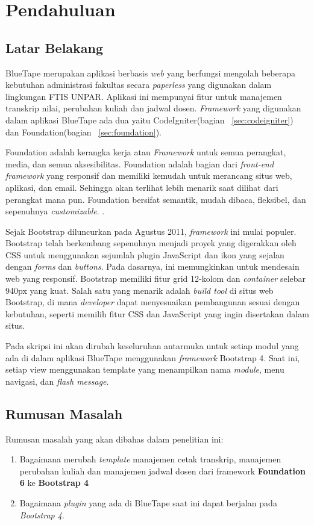 \chapter{Pendahuluan}
\label{chap:intro}
   
\section{Latar Belakang}
\label{sec:label}

\par BlueTape merupakan aplikasi berbasis \textit{web} yang berfungsi mengolah beberapa kebutuhan administrasi fakultas secara \textit{paperless} yang digunakan dalam lingkungan FTIS UNPAR.  Aplikasi ini mempunyai fitur untuk manajemen transkrip nilai, perubahan kuliah dan jadwal dosen. \textit{Framework} yang digunakan dalam aplikasi BlueTape ada dua yaitu CodeIgniter(bagian ~\ref{sec:codeigniter}) dan Foundation(bagian ~\ref{sec:foundation}).  \par
Foundation adalah kerangka kerja atau \textit{Framework } untuk semua perangkat, media, dan semua aksesibilitas. Foundation adalah bagian dari \textit{front-end framework}  yang responsif dan memiliki kemudah untuk merancang situs web, aplikasi, dan email. Sehingga akan terlihat lebih menarik saat dilihat dari perangkat mana pun. Foundation bersifat semantik, mudah dibaca, fleksibel, dan sepenuhnya \textit{customizable}.
\cite{zurbfoundation:17}.\par
Sejak Bootstrap diluncurkan pada Agustus 2011, \textit{framework} ini mulai populer. Bootstrap telah berkembang sepenuhnya menjadi proyek yang digerakkan oleh CSS untuk menggunakan sejumlah plugin JavaScript dan ikon yang sejalan dengan \textit{forms} dan \textit{buttons}. Pada dasarnya, ini memungkinkan untuk mendesain web yang responsif. Bootstrap memiliki fitur grid 12-kolom dan \textit{container} selebar 940px yang kuat. Salah satu yang menarik adalah \textit{build tool} di situs web Bootstrap, di mana \textit{developer} dapat menyesuaikan pembangunan sesuai dengan kebutuhan, seperti memilih fitur CSS dan JavaScript yang ingin disertakan dalam situs. \cite{bootstrap:19}\par
Pada skripsi ini akan dirubah keseluruhan  antarmuka untuk setiap modul yang ada di dalam aplikasi BlueTape menggunakan \textit{framework} Bootstrap 4. Saat ini, setiap view menggunakan template yang menampilkan nama \textit{module}, menu navigasi, dan \textit{flash message}.


\section{Rumusan Masalah}
\label{sec:rumusan}
Rumusan masalah yang akan dibahas dalam penelitian ini:
\begin{enumerate}
	\item Bagaimana merubah \textit{template} manajemen cetak transkrip, manajemen perubahan kuliah dan manajemen jadwal dosen dari framework \textbf{Foundation 6} ke \textbf{Bootstrap 4}
	\item Bagaimana \textit{plugin} yang ada di BlueTape saat ini dapat berjalan pada \textit{Bootstrap 4}.
\end{enumerate}

